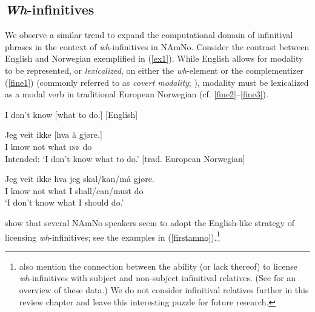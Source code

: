 \documentclass[output=paper,colorlinks,citecolor=brown]{langscibook}
\begin{document}
\subsection{\textit{Wh}-infinitives} \label{whinfs}

We observe a similar trend to expand the computational domain of infinitival phrases in the context of \textit{wh}-infinitives in NAmNo. Consider the contrast between English and Norwegian exemplified in (\ref{ex1}). While English allows for modality to be represented, or \textit{lexicalized}, on either the \textit{wh}-element or the complementizer (\ref{fine1}) (commonly referred to as \textit{covert modality}; \citealt{bhatt1999,groen1982,portner1997}), modality must be lexicalized as a modal verb in traditional European Norwegian (cf. \ref{fine2}--\ref{fine3}). 

\begin{exe}

\item \label{ex1}

\begin{xlist}

\item I don't know [what to do.] \label{fine1} \hfill[English]

\item\label{fine2} \gll *Jeg veit ikke [hva {\aa} gj{\o}re.] \\
         I know not what \textsc{inf} do \\
         \glt Intended: `I don't know what to do.' \hfill[trad. European Norwegian]

\item \label{fine3} \gll Jeg veit ikke hva jeg skal/kan/m{\aa} gj{\o}re. \\
         I know not what I shall/can/must do \\
         \glt `I don't know what I should do.' 
 
\end{xlist}

\end{exe}

\citet{putsoft23} show that several NAmNo speakers seem to adopt the English-like strategy of licensing \textit{wh}-infinitives; see the examples in (\ref{firstamno}).\footnote{\citet{putsoft23} also mention the connection between the ability (or lack thereof) to license \textit{wh}-infinitives with subject and non-subject infinitival relatives. (See \citealt[Section 3.3]{putsoft23} for an overview of these data.) We do not consider infinitival relatives further in this review chapter and leave this interesting puzzle for future research.} 
\end{document}

